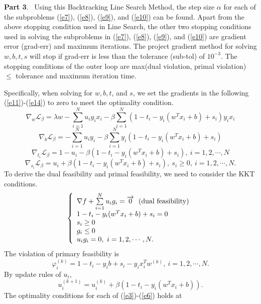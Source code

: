 \documentclass[12pt]{article}
\begin{document}
\vskip 0.3cm
\noindent
{\bf Part 3}. \ Using this Backtracking Line Search Method, the step size $\alpha$ for each of the subproblems (\ref{e7}), (\ref{e8}), (\ref{e9}), and (\ref{e10}) can be found. Apart from the above stopping condition used in Line Search, the other two stopping conditions used in solving the subproblems in (\ref{e7}), (\ref{e8}), (\ref{e9}), and (\ref{e10}) are gradient error (grad-err) and maximum iterations. The project gradient method for solving $w, b, t, s$ will stop if grad-err is less than the tolerance (sub-tol) of $10^{-3}$. The stopping conditions of the outer loop are max(dual violation, primal violation) $\leq$ tolerance and maximum iteration time. 

Specifically, when solving for $w,b,t$, and $s$, we set the gradients in the following (\ref{e11})-(\ref{e14}) to zero to meet the optimality condition.
\begin{equation}\label{e11}
\nabla_{w}{\mathcal L}_{\beta}=\lambda w-\sum\limits_{i=1}^Nu_iy_ix_i-\beta\sum\limits_{i=1}^N(1-t_i-y_i(w^Tx_i+b)+s_i)y_ix_i
\end{equation} 
\begin{equation}\label{e12}
\nabla_{b}{\mathcal L}_{\beta}=-\sum\limits_{i=1}^Nu_iy_i-\beta\sum\limits_{i=1}^Ny_i(1-t_i-y_i(w^Tx_i+b)+s_i)
\end{equation} 
\begin{equation}\label{e13}
\nabla_{t_i}{\mathcal L}_{\beta}=1-u_i-\beta(1-t_i-y_i(w^Tx_i+b)+s_i), \ i=1,2,\cdots, N
\end{equation} 
\begin{equation}\label{e14}
\nabla_{s_i}{\mathcal L}_{\beta}=u_i+\beta(1-t_i-y_i(w^Tx_i+b)+s_i), \ s_i\geq 0, \ i=1,2,\cdots, N.
\end{equation}
\vskip 0.2cm
\noindent 
To derive the dual feasibility and primal feasibility, we need to consider the KKT conditions.
$$
\left\{
\begin{array}{l}
\nabla f+\sum\limits_{i=1}^Nu_ig_i=\overrightarrow{0} \ \ ({\rm dual \  feasibility})\\
1-t_i-y_i(w^Tx_i+b)+s_i=0 \\
s_i\geq 0\\
g_i\leq 0\\
u_ig_i=0, \ i=1,2,\cdots, N. 
\end{array}
\right.
$$
The violation of primary feasibility is 
$$
\varphi_i^{(k)}=1-t_i-y_ib+s_i-y_ix_i^Tw^{(k)}, \ i=1,2,\cdots,N.
$$
By update rules of $u_i$, 
$$
u_i^{(k+1)}=u_i^{(k)}+\beta(1-t_i-y_i(w^Tx_i+b)).
$$
The optimality conditions for each of  (\ref{e3})-(\ref{e6}) holds at 
\end{document}
